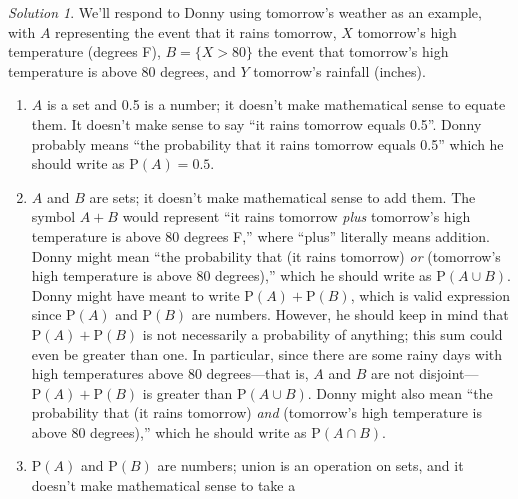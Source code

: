 \documentclass[
  letterpaper,
  DIV=11,
  numbers=noendperiod]{scrreprt}
\providecommand{\tightlist}{%
  \setlength{\itemsep}{0pt}\setlength{\parskip}{0pt}}
\theoremstyle{plain}
\theoremstyle{definition}
\theoremstyle{definition}
\theoremstyle{definition}
\theoremstyle{remark}
\newtheorem{refsolution}{Solution}[chapter]
\begin{document}
\begin{tcolorbox}[enhanced jigsaw, opacityback=0, rightrule=.15mm, coltitle=black, colframe=quarto-callout-tip-color-frame, toprule=.15mm, colbacktitle=quarto-callout-tip-color!10!white, opacitybacktitle=0.6, left=2mm, toptitle=1mm, breakable, title={Solution (click to expand)}, bottomtitle=1mm, colback=white, leftrule=.75mm, titlerule=0mm, arc=.35mm, bottomrule=.15mm]

\begin{refsolution}
We'll respond to Donny using tomorrow's weather as an example, with
\(A\) representing the event that it rains tomorrow, \(X\) tomorrow's
high temperature (degrees F), \(B=\{X>80\}\) the event that tomorrow's
high temperature is above 80 degrees, and \(Y\) tomorrow's rainfall
(inches).

\begin{enumerate}
\def\labelenumi{\arabic{enumi}.}
\tightlist
\item
  \(A\) is a set and 0.5 is a number; it doesn't make mathematical sense
  to equate them. It doesn't make sense to say ``it rains tomorrow
  equals 0.5''. Donny probably means ``the probability that it rains
  tomorrow equals 0.5'' which he should write as
  \(\textrm{P}(A) = 0.5\).
\item
  \(A\) and \(B\) are sets; it doesn't make mathematical sense to add
  them. The symbol \(A + B\) would represent ``it rains tomorrow
  \emph{plus} tomorrow's high temperature is above 80 degrees F,'' where
  ``plus'' literally means addition. Donny might mean ``the probability
  that (it rains tomorrow) \emph{or} (tomorrow's high temperature is
  above 80 degrees),'' which he should write as
  \(\textrm{P}(A \cup B)\). Donny might have meant to write
  \(\textrm{P}(A) + \textrm{P}(B)\), which is valid expression since
  \(\textrm{P}(A)\) and \(\textrm{P}(B)\) are numbers. However, he
  should keep in mind that \(\textrm{P}(A) + \textrm{P}(B)\) is not
  necessarily a probability of anything; this sum could even be greater
  than one. In particular, since there are some rainy days with high
  temperatures above 80 degrees---that is, \(A\) and \(B\) are not
  disjoint---\(\textrm{P}(A) + \textrm{P}(B)\) is greater than
  \(\textrm{P}(A\cup B)\). Donny might also mean ``the probability that
  (it rains tomorrow) \emph{and} (tomorrow's high temperature is above
  80 degrees),'' which he should write as \(\textrm{P}(A \cap B)\).
\item
  \(\textrm{P}(A)\) and \(\textrm{P}(B)\) are numbers; union is an
  operation on sets, and it doesn't make mathematical sense to take a

\end{enumerate}
\end{refsolution}
\end{tcolorbox}
\end{document}

